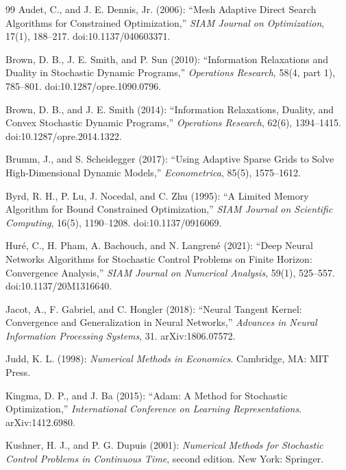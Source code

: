 \begin{thebibliography}{99}
Audet, C., and J. E. Dennis, Jr. (2006): ``Mesh Adaptive Direct Search Algorithms for Constrained Optimization,'' \emph{SIAM Journal on Optimization}, 17(1), 188--217. doi:10.1137/040603371.

Brown, D. B., J. E. Smith, and P. Sun (2010): ``Information Relaxations and Duality in Stochastic Dynamic Programs,'' \emph{Operations Research}, 58(4, part 1), 785--801. doi:10.1287/opre.1090.0796.

Brown, D. B., and J. E. Smith (2014): ``Information Relaxations, Duality, and Convex Stochastic Dynamic Programs,'' \emph{Operations Research}, 62(6), 1394--1415. doi:10.1287/opre.2014.1322.

Brumm, J., and S. Scheidegger (2017): ``Using Adaptive Sparse Grids to Solve High-Dimensional Dynamic Models,'' \emph{Econometrica}, 85(5), 1575--1612.

Byrd, R. H., P. Lu, J. Nocedal, and C. Zhu (1995): ``A Limited Memory Algorithm for Bound Constrained Optimization,'' \emph{SIAM Journal on Scientific Computing}, 16(5), 1190--1208. doi:10.1137/0916069.

Hur\'e, C., H. Pham, A. Bachouch, and N. Langren\'e (2021): ``Deep Neural Networks Algorithms for Stochastic Control Problems on Finite Horizon: Convergence Analysis,'' \emph{SIAM Journal on Numerical Analysis}, 59(1), 525--557. doi:10.1137/20M1316640.

Jacot, A., F. Gabriel, and C. Hongler (2018): ``Neural Tangent Kernel: Convergence and Generalization in Neural Networks,'' \emph{Advances in Neural Information Processing Systems}, 31. arXiv:1806.07572.

Judd, K. L. (1998): \emph{Numerical Methods in Economics}. Cambridge, MA: MIT Press.

Kingma, D. P., and J. Ba (2015): ``Adam: A Method for Stochastic Optimization,'' \emph{International Conference on Learning Representations}. arXiv:1412.6980.

Kushner, H. J., and P. G. Dupuis (2001): \emph{Numerical Methods for Stochastic Control Problems in Continuous Time}, second edition. New York: Springer.


\end{thebibliography}
